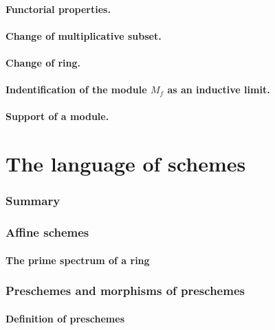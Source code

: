 \documentclass[10pt,oneside]{amsart}
\begin{document}
        \subsection{Functorial properties.}
        

        \subsection{Change of multiplicative subset.}
        

        \subsection{Change of ring.}
        

        \subsection{Indentification of the module $M_f$ as an inductive limit.}
        

        \subsection{Support of a module.}
        

\clearpage


\setcounter{subsection}{0}
\part{The language of schemes}
    
    \section*{Summary}
    

    \section{Affine schemes}
       
       \subsection{The prime spectrum of a ring}



    \section{Preschemes and morphisms of preschemes}

        \subsection{Definition of preschemes}
        
\end{document}
